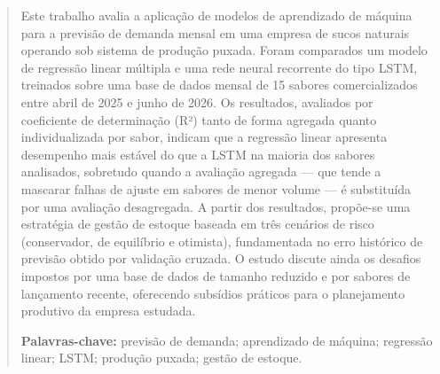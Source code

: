 \begin{abstract}
Este trabalho avalia a aplicação de modelos de aprendizado de máquina para a previsão
de demanda mensal em uma empresa de sucos naturais operando sob sistema de produção
puxada. Foram comparados um modelo de regressão linear múltipla e uma rede neural
recorrente do tipo LSTM, treinados sobre uma base de dados mensal de 15 sabores
comercializados entre abril de 2025 e junho de 2026. Os resultados, avaliados por
coeficiente de determinação (R²) tanto de forma agregada quanto individualizada por
sabor, indicam que a regressão linear apresenta desempenho mais estável do que a
LSTM na maioria dos sabores analisados, sobretudo quando a avaliação agregada — que
tende a mascarar falhas de ajuste em sabores de menor volume — é substituída por uma
avaliação desagregada. A partir dos resultados, propõe-se uma estratégia de gestão de
estoque baseada em três cenários de risco (conservador, de equilíbrio e otimista),
fundamentada no erro histórico de previsão obtido por validação cruzada. O estudo
discute ainda os desafios impostos por uma base de dados de tamanho reduzido e por
sabores de lançamento recente, oferecendo subsídios práticos para o planejamento
produtivo da empresa estudada.

\textbf{Palavras-chave:} previsão de demanda; aprendizado de máquina; regressão linear;
LSTM; produção puxada; gestão de estoque.
\end{abstract}